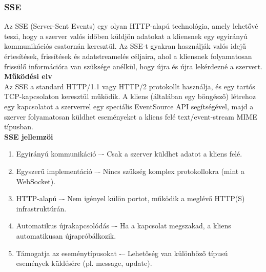 \documentclass{thesis-ekf}
\theoremstyle{definition}
\theoremstyle{remark}
\begin{document}
	\subsubsection{SSE}
	\label{sssec_SSE}
	Az SSE (Server-Sent Events) egy olyan HTTP-alapú technológia, amely lehetővé teszi, hogy a szerver valós időben küldjön adatokat a kliensnek egy egyirányú kommunikációs csatornán keresztül. Az SSE-t gyakran használják valós idejű értesítések, frissítések és adatstreamelés céljaira, ahol a kliensnek folyamatosan frissülő információra van szüksége anélkül, hogy újra és újra lekérdezné a szervert\cite{bib_SSE_spec,bib_SSE}.\\
	\textbf{Működési elv}\\
	Az SSE a standard HTTP/1.1 vagy HTTP/2 protokollt használja, és egy tartós TCP-kapcsolaton keresztül működik. A kliens (általában egy böngésző) létrehoz egy kapcsolatot a szerverrel egy speciális EventSource API segítségével, majd a szerver folyamatosan küldhet eseményeket a kliens felé text/event-stream MIME típusban.\\
	\textbf{SSE jellemzöi}\\
	\begin{enumerate}
		\item Egyirányú kommunikáció –- Csak a szerver küldhet adatot a kliens felé.
		\item Egyszerű implementáció –- Nincs szükség komplex protokollokra (mint a WebSocket).
		\item HTTP-alapú –- Nem igényel külön portot, működik a meglévő HTTP(S) infrastruktúrán.
		\item Automatikus újrakapcsolódás –- Ha a kapcsolat megszakad, a kliens automatikusan újrapróbálkozik.
		\item Támogatja az eseménytípusokat -– Lehetőség van különböző típusú események küldésére (pl. message, update).
	\end{enumerate}
	
\end{document}
